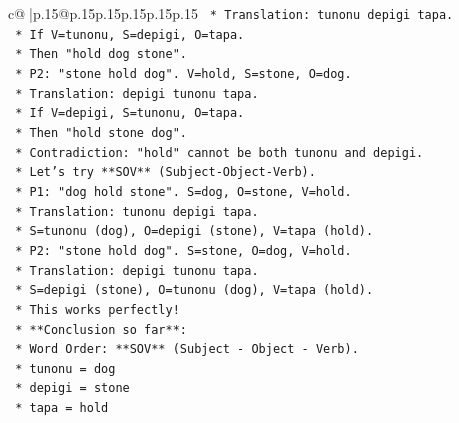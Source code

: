 \documentclass{article}
\begin{document}
{\begin{supertabular}{c@{$\;$}|p{.15\linewidth}@{}p{.15\linewidth}p{.15\linewidth}p{.15\linewidth}p{.15\linewidth}p{.15\linewidth}}
{{{\texttt{                                    *   Translation: tunonu depigi tapa.} \\
\texttt{                                    *   If V=tunonu, S=depigi, O=tapa.} \\
\texttt{                                    *   Then "hold dog stone".} \\
\texttt{                                    *   P2: "stone hold dog". V=hold, S=stone, O=dog.} \\
\texttt{                                    *   Translation: depigi tunonu tapa.} \\
\texttt{                                    *   If V=depigi, S=tunonu, O=tapa.} \\
\texttt{                                    *   Then "hold stone dog".} \\
\texttt{                                    *   Contradiction: "hold" cannot be both tunonu and depigi.} \\
\texttt{                                *   Let's try **SOV** (Subject{-}Object{-}Verb).} \\
\texttt{                                    *   P1: "dog hold stone". S=dog, O=stone, V=hold.} \\
\texttt{                                    *   Translation: tunonu depigi tapa.} \\
\texttt{                                    *   S=tunonu (dog), O=depigi (stone), V=tapa (hold).} \\
\texttt{                                    *   P2: "stone hold dog". S=stone, O=dog, V=hold.} \\
\texttt{                                    *   Translation: depigi tunonu tapa.} \\
\texttt{                                    *   S=depigi (stone), O=tunonu (dog), V=tapa (hold).} \\
\texttt{                                    *   This works perfectly!} \\
\texttt{                                    *   **Conclusion so far**:} \\
\texttt{                                        *   Word Order: **SOV** (Subject {-} Object {-} Verb).} \\
\texttt{                                        *   tunonu = dog} \\
\texttt{                                        *   depigi = stone} \\
\texttt{                                        *   tapa = hold} \\
}}}
\end{supertabular}}
\end{document}
